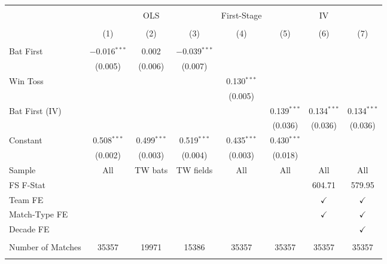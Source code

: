 
\begin{tabular}{@{\extracolsep{5pt}}lccccccc} 
\\[-1.8ex]\hline \\[-1.8ex] 
 & \multicolumn{3}{c}{OLS} & First-Stage & \multicolumn{3}{c}{IV} \\ 
\\[-1.8ex] & (1) & (2) & (3) & (4) & (5) & (6) & (7)\\ 
\hline \\[-1.8ex] 
 Bat First & $-$0.016$^{***}$ & 0.002 & $-$0.039$^{***}$ &  &  &  &  \\ 
  & (0.005) & (0.006) & (0.007) &  &  &  &  \\ 
  Win Toss &  &  &  & 0.130$^{***}$ &  &  &  \\ 
  &  &  &  & (0.005) &  &  &  \\ 
  Bat First (IV) &  &  &  &  & 0.139$^{***}$ & 0.134$^{***}$ & 0.134$^{***}$ \\ 
  &  &  &  &  & (0.036) & (0.036) & (0.036) \\ 
  Constant & 0.508$^{***}$ & 0.499$^{***}$ & 0.519$^{***}$ & 0.435$^{***}$ & 0.430$^{***}$ &  &  \\ 
  & (0.002) & (0.003) & (0.004) & (0.003) & (0.018) &  &  \\ 
 Sample & All & TW bats & TW fields & All & All & All & All \\ 
FS F-Stat &  &  &  &  &  & 604.71 & 579.95 \\ 
Team FE &  &  &  &  &  & $\checkmark$ & $\checkmark$ \\ 
Match-Type FE &  &  &  &  &  & $\checkmark$ & $\checkmark$ \\ 
Decade FE &  &  &  &  &  &  & $\checkmark$ \\ 
\hline &  &  &  &  &  &  &  \\ 
Number of Matches & 35357 & 19971 & 15386 & 35357 & 35357 & 35357 & 35357 \\ 
\hline \\[-1.8ex] 
\end{tabular} 
